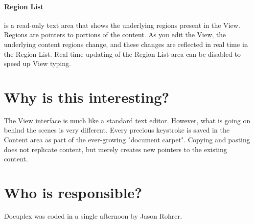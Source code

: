 \documentclass[12pt]{article}
\begin{document}
\paragraph{Region List} is a read-only text area that shows the underlying regions present in the View.  Regions are pointers to portions of the content.  As you edit the View, the underlying content regions change, and these changes are reflected in real time in the Region List.  Real time updating of the Region List area can be disabled to speed up View typing.



\section{Why is this interesting?}
The View interface is much like a standard text editor.  However, what is going on behind the scenes is very different.  Every precious keystroke is saved in the Content area as part of the ever-growing "document carpet".  Copying and pasting does not replicate content, but merely creates new pointers to the existing content.

\section{Who is responsible?}
Docuplex was coded in a single afternoon by Jason Rohrer.

\end{document}
